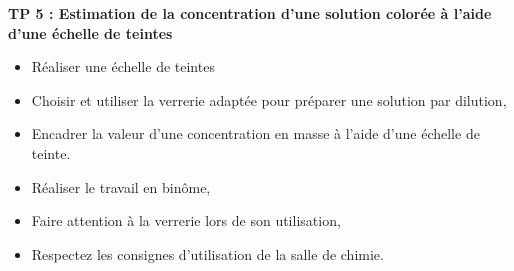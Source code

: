 \modeCorrection


\renewcommand{\thesubsection}{\textcolor{red}{\Roman{section}.\arabic{subsection}}}
\renewcommand{\thesubsubsection}{\textcolor{red}{\Roman{section}.\arabic{subsection}.\alph{subsubsection}}}

\setcounter{section}{0}
\setcounter{document}{0}
\sndEnTeteTPCinq

\begin{center}
\begin{mdframed}[style=titr, leftmargin=60pt, rightmargin=60pt, innertopmargin=7pt, innerbottommargin=7pt, innerrightmargin=8pt, innerleftmargin=8pt]

\begin{center}
\large{\textbf{TP 5 : Estimation de la concentration d'une solution colorée à l'aide d'une échelle de teintes
}}
\end{center}


\end{mdframed}
\end{center}

\begin{tcolorbox}[colback=blue!5!white,colframe=blue!75!black,title=Objectifs de la séance :]
\begin{itemize}
    \item Réaliser une échelle de teintes
    \item Choisir et utiliser la verrerie adaptée pour préparer une solution par dilution,
    \item Encadrer la valeur d’une concentration en masse à l’aide d’une échelle de teinte.
\end{itemize}
\end{tcolorbox}

\begin{tcolorbox}[colback=red!5!white,colframe=red!75!black,title= Consignes :]
\begin{itemize}
    \item Réaliser le travail en binôme,
    \item Faire attention à la verrerie lors de son utilisation,
    \item Respectez les consignes d'utilisation de la salle de chimie.
\end{itemize}
\end{tcolorbox}


